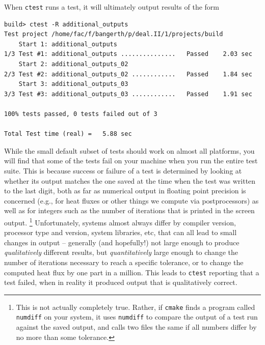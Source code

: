 \documentclass{article}
\begin{document}
When \texttt{ctest} runs a test, it will ultimately output results of the form
\begin{lstlisting}[frame=single,language=ksh]
build> ctest -R additional_outputs
Test project /home/fac/f/bangerth/p/deal.II/1/projects/build
    Start 1: additional_outputs
1/3 Test #1: additional_outputs ...............   Passed    2.03 sec
    Start 2: additional_outputs_02
2/3 Test #2: additional_outputs_02 ............   Passed    1.84 sec
    Start 3: additional_outputs_03
3/3 Test #3: additional_outputs_03 ............   Passed    1.91 sec

100% tests passed, 0 tests failed out of 3

Total Test time (real) =   5.88 sec
\end{lstlisting}
While the small default subset of tests should work on almost all platforms, you
will find that some of the tests fail on your machine when you run the entire
test suite. This is because success or failure of a test is determined by looking
at whether its output matches the one saved at the time when the test was
written to the last digit, both as far as numerical output in floating point
precision is concerned (e.g., for heat fluxes or other things we compute via
postprocessors) as well as for integers such as the number of iterations that
is printed in the screen output.%
\footnote{This is not actually completely true. Rather, if \texttt{cmake} finds
a program called \texttt{numdiff} on your system, it uses \texttt{numdiff} to compare the
output of a test run against the saved output, and calls two files the same if
all numbers differ by no more than some tolerance.}
Unfortunately, systems almost always differ by compiler version, processor type
and version, system libraries, etc, that can all lead to small changes in output
-- generally (and hopefully!) not large enough to produce \textit{qualitatively}
different results, but \textit{quantitatively} large enough to change the number
of iterations necessary to reach a specific tolerance, or to change the computed
heat flux by one part in a million. This leads to \texttt{ctest} reporting that
a test failed, when in reality it produced output that is qualitatively correct.
\end{document}
